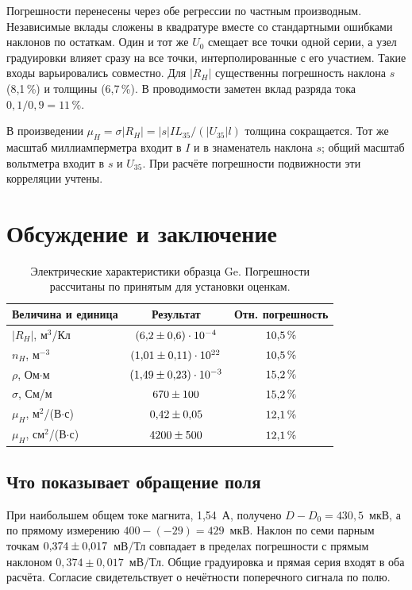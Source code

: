 \documentclass[a4paper,12pt]{article}
\begin{document}
Погрешности перенесены через обе регрессии по частным производным. Независимые вклады сложены в квадратуре вместе со стандартными ошибками наклонов по остаткам. Один и тот же $U_0$ смещает все точки одной серии, а узел градуировки влияет сразу на все точки, интерполированные с его участием. Такие входы варьировались совместно. Для $|R_H|$ существенны погрешность наклона $s$ (8,1\,\%) и толщины (6,7\,\%). В проводимости заметен вклад разряда тока $0{,}1/0{,}9=11\,\%$.

В произведении $\mu_H=\sigma|R_H|=|s| I L_{35}/(|U_{35}|l)$ толщина сокращается. Тот же масштаб миллиамперметра входит в $I$ и в знаменатель наклона $s$; общий масштаб вольтметра входит в $s$ и $U_{35}$. При расчёте погрешности подвижности эти корреляции учтены.

\section{Обсуждение и заключение}
\begin{table}[h!]\centering
\caption{Электрические характеристики образца Ge. Погрешности рассчитаны по принятым для установки оценкам.}\label{tab:results}
\begin{tabular}{lcc}\hline
Величина и единица & Результат & Отн. погрешность\\\hline
$|R_H|$, м$^3$/Кл & $(6{,}2 \pm 0{,}6)\cdot10^{-4}$ & $10{,}5\,\%$\\
$n_H$, м$^{-3}$ & $(1{,}01 \pm 0{,}11)\cdot10^{22}$ & $10{,}5\,\%$\\
$\rho$, Ом$\cdot$м & $(1{,}49 \pm 0{,}23)\cdot10^{-3}$ & $15{,}2\,\%$\\
$\sigma$, См/м & $670 \pm 100$ & $15{,}2\,\%$\\
$\mu_H$, м$^2$/(В$\cdot$с) & $0{,}42 \pm 0{,}05$ & $12{,}1\,\%$\\
$\mu_H$, см$^2$/(В$\cdot$с) & $4200 \pm 500$ & $12{,}1\,\%$\\\hline
\end{tabular}
\end{table}

\clearpage
\subsection*{Что показывает обращение поля}
При наибольшем общем токе магнита, 1,54~А, получено $D-D_0=430{,}5$~мкВ, а по прямому измерению $400-(-29)=429$~мкВ. Наклон по семи парным точкам $0{,}374 \pm 0{,}017$~мВ/Тл совпадает в пределах погрешности с прямым наклоном $0{,}374\pm0{,}017$~мВ/Тл. Общие градуировка и прямая серия входят в оба расчёта. Согласие свидетельствует о нечётности поперечного сигнала по полю.
\end{document}
